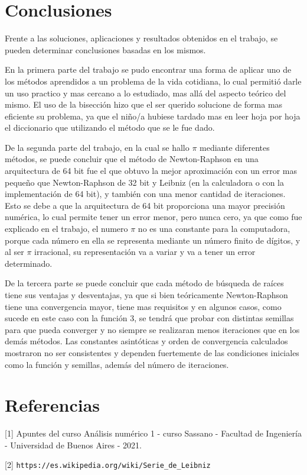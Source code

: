 \documentclass[titlepage,a4paper]{article}
\begin{document}
\section{Conclusiones}
Frente a las soluciones, aplicaciones y resultados obtenidos en el trabajo, se pueden determinar conclusiones basadas en los mismos. 

En la primera parte del trabajo se pudo encontrar una forma de aplicar uno de los métodos aprendidos a un problema de la vida cotidiana, lo cual permitió darle un uso practico y mas cercano a lo estudiado, mas allá del aspecto teórico del mismo. El uso de la bisección hizo que el ser querido solucione de forma mas eficiente su problema, ya que el niño/a hubiese tardado mas en leer hoja por hoja el diccionario que utilizando el método que se le fue dado. 

De la segunda parte del trabajo, en la cual se hallo $\pi$ mediante diferentes métodos, se puede concluir que el método de Newton-Raphson en una arquitectura de 64 bit fue el que obtuvo la mejor aproximación con un error mas pequeño que Newton-Raphson de 32 bit y Leibniz (en la calculadora o con la implementación de 64 bit), y también con una menor cantidad de iteraciones. Esto se debe a que la arquitectura de 64 bit proporciona una mayor precisión numérica, lo cual permite tener un error menor, pero nunca cero, ya que como fue explicado en el trabajo, el numero $\pi$ no es una constante para la computadora, porque cada número en ella se representa mediante un número finito de dígitos, y al ser $\pi$ irracional, su representación va a variar y va a tener un error determinado.

De la tercera parte se puede concluir que cada método de búsqueda de raíces tiene sus ventajas y desventajas, ya que si bien teóricamente Newton-Raphson tiene una convergencia mayor, tiene mas requisitos y en algunos casos, como sucede en este caso con la función 3, se tendrá que probar con distintas semillas para que pueda converger y no siempre se realizaran menos iteraciones que en los demás métodos. 
Las constantes asintóticas y orden de convergencia calculados mostraron no ser consistentes y dependen fuertemente de las condiciones iniciales como la función y semillas, además del número de iteraciones.

\newpage
\section{Referencias}
[1] Apuntes del curso Análisis numérico 1 - curso Sassano - Facultad de Ingeniería - Universidad de Buenos Aires - 2021.

[2] \verb|https://es.wikipedia.org/wiki/Serie_de_Leibniz|
\end{document}
